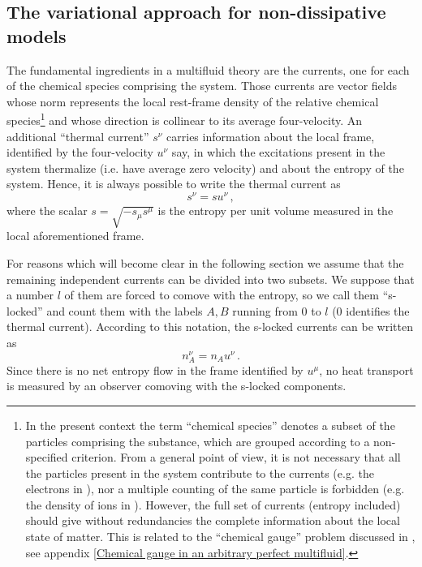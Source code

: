 \documentclass[usenatbib]{mnras}
\begin{document}
\subsection{The variational approach for non-dissipative models}
\label{Gftva}

The fundamental ingredients in a multifluid theory are the currents, one for each of the chemical species comprising the system. Those currents are vector fields whose norm represents the local rest-frame density of the relative chemical species\footnote{
	In the present context the term ``chemical species'' denotes a subset of the particles comprising the substance, which are grouped according to a non-specified criterion. From a general point of view, it is not necessary that all the particles present in the system contribute to the currents (e.g. the electrons in \cite{langlois98}), nor a multiple counting of the same particle is forbidden (e.g. the density of ions in \cite{carter_macro_2006}). However, the full set of currents (entropy included) should give  without redundancies the complete information about the local state of matter. This is related to the ``chemical gauge'' problem discussed in \cite{carter_macro_2006}, see appendix \ref{Chemical gauge in an arbitrary perfect multifluid}.
}
and whose direction is collinear to its average four-velocity. 
An additional ``thermal current'' $s^\nu$ carries information about the local frame, identified by the four-velocity $u^\nu$ say, in which the excitations present in the system thermalize (i.e. have average zero velocity) and about the entropy of the system. Hence, it is always possible to write the thermal current as
%
\begin{equation}
s^\nu = s u^\nu \, ,
\label{u_T}
\end{equation}
%
where the scalar $s=\sqrt{-s_\mu s^\mu}$ is the entropy per unit volume measured in the local aforementioned frame.

For reasons which will become clear in the following section we assume that the remaining independent currents can be divided into two subsets. We suppose that a number $l$ of them are forced to comove with the entropy, so we call them ``s-locked'' and count them with the labels $A,B$ running from 0 to $l$ (0 identifies the thermal current).  According to this notation, the s-locked currents can be written as
%
\begin{equation}\label{s-locking}
n_A^\nu = n_A u^\nu \, .
\end{equation}
%
Since there is no net entropy flow in the frame identified by $u^\mu$, no heat transport is measured by an observer comoving with the s-locked components.
 
\end{document}
